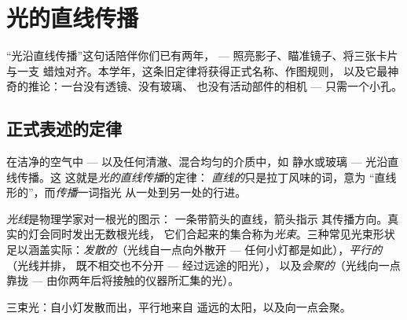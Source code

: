 \chapter{光的直线传播}\label{ch:g6:light-propagation}

“光沿直线传播”这句话陪伴你们已有两年，
--- 照亮影子、瞄准镜子、将三张卡片与一支
蜡烛对齐。本学年，这条旧定律将获得正式名称、作图规则，
以及它最神奇的推论：一台没有透镜、没有玻璃、
也没有活动部件的相机 --- 只需一个小孔。

\section{正式表述的定律}

\begin{proposition}[光的直线传播]\label{prop:g6:light-propagation:law}
在洁净的空气中 --- 以及任何清澈、混合均匀的介质中，如
静水或玻璃 --- 光沿直线传播。这
这就是\emph{光的直线传播}的定律：
\emph{直线的}只是拉丁风味的词，意为
“直线形的”，而\emph{传播}一词指光
从一处到另一处的行进。
\end{proposition}

\begin{definition}[光线与光束]\label{def:g6:light-propagation:ray}
\emph{光线}是物理学家对一根光的图示：
一条带箭头的直线，箭头指示
其传播方向。真实的灯会同时发出无数根光线，
它们合起来的集合称为\emph{光束}。三种常见光束形状
足以涵盖实际：\emph{发散的}（光线自一点向外散开 ---
任何小灯都是如此），\emph{平行的}（光线并排，
既不相交也不分开 --- 经过远途的阳光），
以及\emph{会聚的}（光线向一点靠拢 ---
由你两年后将接触的仪器所汇集的光）。
\end{definition}

\begin{omfigure}

{\small 三束光：自小灯发散而出，平行地来自
遥远的太阳，以及向一点会聚。}
\end{omfigure}

